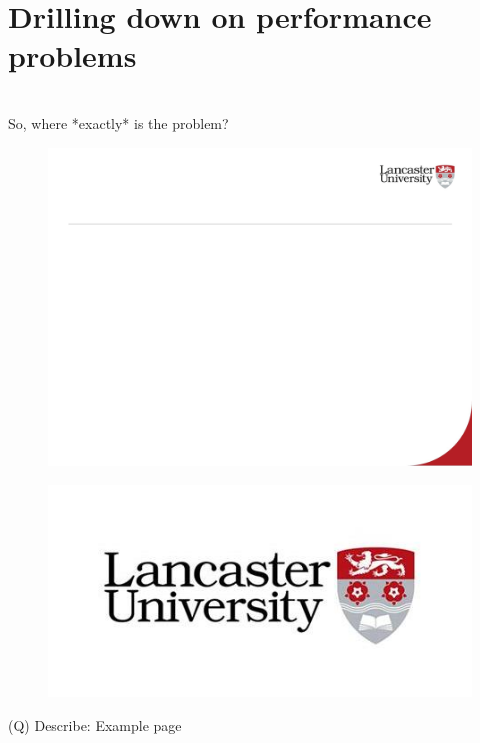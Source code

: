 \documentclass[12pt]{article}
\begin{document}
\section{Drilling down on performance problems}
\\
So, where *exactly* is the problem?\\
\begin{figure}[H]
\includegraphics[width=0.5\linewidth]{page42-image-1.png}
\end{figure}
\begin{figure}[H]
\includegraphics[width=0.5\linewidth]{page42-image-2.png}
\end{figure}
\clearpage
(Q)
Describe: Example page
\clearpage
\end{document}
